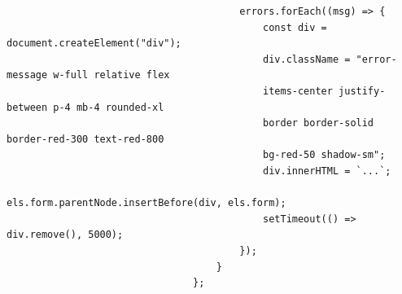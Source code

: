 \documentclass[a4paper,11pt]{article}
\begin{document}
\begin{enumerate}
\begin{tcolorbox}[colback=lightgray!5, colframe=gray!80, left=-65mm, right=5mm, top=2mm, bottom=0mm, boxrule=0.1mm]
\begin{verbatim}
                                        errors.forEach((msg) => {
                                            const div = document.createElement("div");
                                            div.className = "error-message w-full relative flex 
                                            items-center justify-between p-4 mb-4 rounded-xl 
                                            border border-solid border-red-300 text-red-800 
                                            bg-red-50 shadow-sm";
                                            div.innerHTML = `...`;
                                            els.form.parentNode.insertBefore(div, els.form);
                                            setTimeout(() => div.remove(), 5000);
                                        });
                                    }
                                };
                            \end{verbatim}
                        \end{tcolorbox}
                \end{enumerate}
\end{document}
